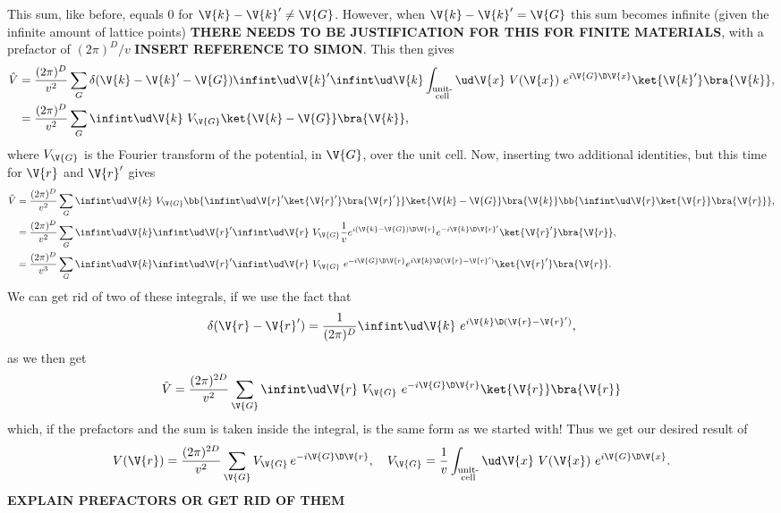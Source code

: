 \documentclass[main.tex]{subfiles}
\begin{document}
	This sum, like before, equals 0 for $ \V{k}-\V{k}' \neq \V{G} $. However, when $ \V{k}-\V{k}' = \V{G} $ this sum becomes infinite (given the infinite amount of lattice points) \textbf{THERE NEEDS TO BE JUSTIFICATION FOR THIS FOR FINITE MATERIALS}, with a prefactor of $ (2\pi)^D/v $ \textbf{INSERT REFERENCE TO SIMON}. This then gives
	\begin{align}
		\hat{V} &= \frac{(2\pi)^D}{v^2} \sum_{G} \delta(\V{k}-\V{k}'-\V{G}) \infint \ud \V{k}' \infint \ud \V{k} \int_{\substack{\text{unit-} \\\text{cell}}} \ud \V{x}\ V(\V{x})\  e^{i \V{G} \D \V{x}} \ket{\V{k}'} \bra{\V{k}}, \\
		&= \frac{(2\pi)^D}{v^2} \sum_{G} \infint \ud \V{k}\ V_{\V{G}} \ket{\V{k}-\V{G}} \bra{\V{k}},
	\end{align}
	where $ V_{\V{G}} $ is the Fourier transform of the potential, in $ \V{G} $, over the unit cell. Now, inserting two additional identities, but this time for $ \V{r} $ and $ \V{r}' $ gives
	\begin{align}
		\hat{V} &= \frac{(2\pi)^D}{v^2} \sum_{G} \infint \ud \V{k} \ V_{\V{G}} \bb{\infint \ud \V{r}' \ket{\V{r}'} \bra{\V{r}'}} \ket{\V{k}-\V{G}} \bra{\V{k}} \bb{\infint \ud \V{r} \ket{\V{r}} \bra{\V{r}} }, \\
		&= \frac{(2\pi)^D}{v^2} \sum_{G} \infint \ud \V{k} \infint \ud \V{r}' \infint \ud \V{r} \   V_{\V{G}} \frac{1}{v} e^{i (\V{k}-\V{G}) \D \V{r}} e^{-i \V{k} \D \V{r}'} \ket{\V{r}'} \bra{\V{r}}, \\
		&= \frac{(2\pi)^D}{v^3} \sum_{G} \infint \ud \V{k} \infint \ud \V{r}' \infint \ud \V{r} \  V_{\V{G}} \  e^{-i \V{G} \D \V{r}} e^{i \V{k} \D (\V{r}-\V{r}')} \ket{\V{r}'} \bra{\V{r}}.
	\end{align}
	We can get rid of two of these integrals, if we use the fact that
	\begin{equation}
		\delta(\V{r}-\V{r}') = \frac{1}{(2\pi)^D} \infint \ud \V{k}\  e^{i \V{k} \D (\V{r}-\V{r}')},
	\end{equation}
	as we then get
	\begin{equation}
		\hat{V} = \frac{(2\pi)^{2D}}{v^2} \sum_{\V{G}} \infint \ud \V{r} \ V_{\V{G}}\ e^{-i \V{G} \D \V{r}} \ket{\V{r}} \bra{\V{r}}
	\end{equation}
	which, if the prefactors and the sum is taken inside the integral, is the same form as we started with! Thus we get our desired result of
	\begin{equation}
		V(\V{r}) =  \frac{(2\pi)^{2D}}{v^2} \sum_{\V{G}} V_{\V{G}} \,e^{-i \V{G} \D \V{r}}, \quad V_{\V{G}} = \frac{1}{v} \int_{\substack{\text{unit-} \\\text{cell}}} \ud \V{x}\ V(\V{x})\  e^{i \V{G} \D \V{x}}.
	\end{equation}
	\textbf{EXPLAIN PREFACTORS OR GET RID OF THEM}
	
\end{document}
